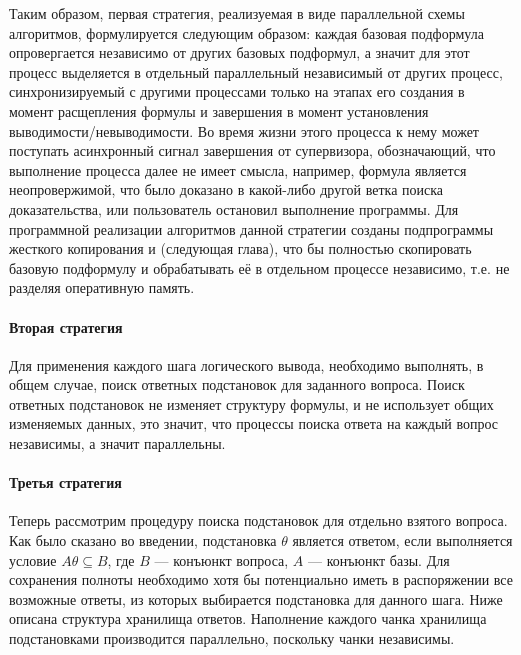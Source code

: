 Таким образом, первая стратегия, реализуемая в виде параллельной схемы алгоритмов, формулируется следующим образом: каждая базовая подформула  опровергается независимо от других базовых подформул, а значит для этот процесс выделяется в отдельный параллельный независимый от других процесс, синхронизируемый с другими процессами только  на этапах его создания в момент расщепления формулы и завершения в момент установления выводимости/невыводимости. Во время жизни этого процесса к нему может поступать асинхронный сигнал завершения от супервизора, обозначающий, что выполнение процесса далее не имеет смысла, например, формула является неопровержимой, что было доказано в какой-либо другой ветка поиска доказательства, или пользователь остановил выполнение программы. Для программной реализации алгоритмов данной стратегии созданы подпрограммы жесткого копирования и  (следующая глава), что бы полностью скопировать базовую подформулу и обрабатывать её в отдельном процессе независимо, т.е. не разделяя оперативную память.


\paragraph{Вторая стратегия}
Для применения каждого шага логического вывода, необходимо выполнять, в общем случае, поиск ответных подстановок для заданного вопроса. Поиск ответных подстановок не изменяет структуру формулы, и не использует общих изменяемых данных, это значит, что процессы поиска ответа на каждый вопрос независимы, а значит параллельны. 


\paragraph{Третья стратегия}
Теперь рассмотрим процедуру поиска подстановок для отдельно взятого вопроса. Как было сказано во введении, подстановка $\theta$ является ответом, если выполняется условие $A\theta \subseteq B$, где $B$ --- конъюнкт вопроса, $A$ --- конъюнкт базы. Для сохранения полноты необходимо хотя бы потенциально иметь в распоряжении все возможные ответы, из которых выбирается подстановка для данного шага. Ниже описана структура хранилища ответов. Наполнение каждого чанка хранилища подстановками производится параллельно, поскольку чанки независимы.


